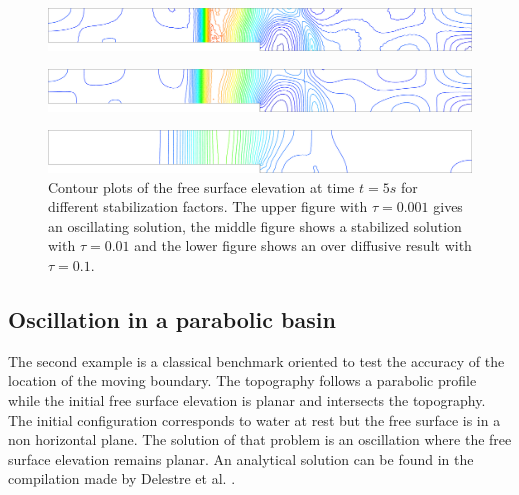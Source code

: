 \documentclass[a4paper,12pt]{article}
\begin{document}
\begin{figure}[H]
    \begin{subfigure}{.05\textwidth}
        \caption{}
    \end{subfigure}
    \begin{minipage}[c]{.94\textwidth}
        \includegraphics[width=\textwidth]{img/step/stab_0.001_time_5.pdf}        
    \end{minipage}
    \par\medskip
    \begin{subfigure}{.05\textwidth}
        \caption{}
    \end{subfigure}
    \begin{minipage}[c]{.94\textwidth}
        \includegraphics[width=\textwidth]{img/step/stab_0.01_time_5.pdf}        
    \end{minipage}
    \par\medskip
    \begin{subfigure}{.05\textwidth}
        \caption{}
    \end{subfigure}
    \begin{minipage}[c]{.94\textwidth}
        \includegraphics[width=\textwidth]{img/step/stab_0.1_time_5.pdf}        
    \end{minipage}
\caption{Contour plots of the free surface elevation at time $t=5s$ for different stabilization factors. The upper figure with $\tau=0.001$ gives an oscillating solution, the middle figure shows a stabilized solution with $\tau=0.01$ and the lower figure shows an over diffusive result with $\tau=0.1$.}
\label{stab_parameters_time2}
\end{figure}



\subsection{Oscillation in a parabolic basin}

The second example is a classical benchmark oriented to test the accuracy of the location of the moving boundary. The topography follows a parabolic profile while the initial free surface elevation is planar and intersects the topography. The initial configuration corresponds to water at rest but the free surface is in a non horizontal plane. The solution of that problem is an oscillation where the free surface elevation remains planar. An analytical solution can be found in the compilation made by Delestre et al. \cite{delestre2013}.
\end{document}
